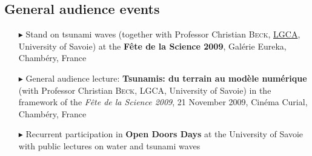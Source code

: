     \separator
    \subsection{General audience events}
    \begin{itemize}
        \item[$\blacktriangleright$] Stand on tsunami waves (together with Professor Christian \textsc{Beck}, \href{http://lgca.univ-savoie.fr/}{LGCA}, University of Savoie) at the \textbf{F\^ete de la Science 2009}, Gal\'erie Eureka, Chamb\'ery, France
        \item[$\blacktriangleright$] General audience lecture: \textbf{Tsunamis: du terrain au mod\`ele num\'erique} (with Professor Christian \textsc{Beck}, LGCA, University of Savoie) in the framework of the \textit{F\^ete de la Science 2009}, 21 November 2009, Cin\'ema Curial, Chamb\'ery, France
        \item[$\blacktriangleright$] Recurrent participation in \textbf{Open Doors Days} at the University of Savoie with public lectures on water and tsunami waves
    \end{itemize}